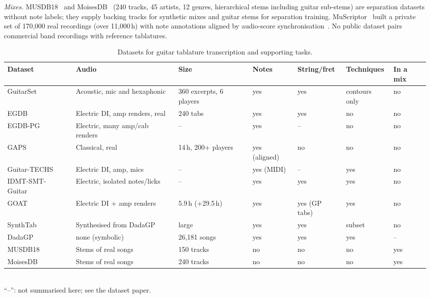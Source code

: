 \emph{Mixes.} MUSDB18~\cite{rafii2017musdb18} and MoisesDB~\cite{pereira2023moisesdb}
(240 tracks, 45 artists, 12 genres, hierarchical stems including guitar
sub-stems) are separation datasets without note labels; they supply backing
tracks for synthetic mixes and guitar stems for separation training.
MuScriptor~\cite{rouard2026muscriptor} built a private set of 170,000 real
recordings (over 11,000\,h) with note annotations aligned by audio-score
synchronisation~\cite{muller2021sync}. No public dataset pairs commercial
band recordings with reference tablatures.

\begin{table}[t]
\centering
\caption{Datasets for guitar tablature transcription and supporting tasks.}
\label{tab:datasets}
\footnotesize
\setlength{\tabcolsep}{4pt}
\begin{tabular}{@{}lllllll@{}}
\toprule
Dataset & Audio & Size & Notes & String/fret & Techniques & In a mix \\
\midrule
GuitarSet~\cite{xi2018guitarset} & Acoustic, mic and hexaphonic & 360 excerpts, 6 players & yes & yes & contours only & no \\
EGDB~\cite{chen2022egdb} & Electric DI, amp renders, real & 240 tabs & yes & yes & no & no \\
EGDB-PG~\cite{chen2025egdbpg} & Electric, many amp/cab renders & -- & yes & -- & no & no \\
GAPS~\cite{riley2024gaps} & Classical, real & 14\,h, 200+ players & yes (aligned) & no & no & no \\
Guitar-TECHS~\cite{pedroza2025guitartechs} & Electric DI, amp, mics & -- & yes (MIDI) & -- & yes & no \\
IDMT-SMT-Guitar~\cite{kehling2014idmt} & Electric, isolated notes/licks & -- & yes & yes & yes & no \\
GOAT~\cite{loth2025goat} & Electric DI + amp renders & 5.9\,h (+29.5\,h) & yes & yes (GP tabs) & yes & no \\
SynthTab~\cite{zang2024synthtab} & Synthesised from DadaGP & large & yes & yes & subset & no \\
DadaGP~\cite{sarmento2021dadagp} & none (symbolic) & 26,181 songs & yes & yes & yes & -- \\
MUSDB18~\cite{rafii2017musdb18} & Stems of real songs & 150 tracks & no & no & no & yes \\
MoisesDB~\cite{pereira2023moisesdb} & Stems of real songs & 240 tracks & no & no & no & yes \\
\bottomrule
\end{tabular}
\\[2pt]
{\scriptsize ``--'': not summarised here; see the dataset paper.}
\end{table}
